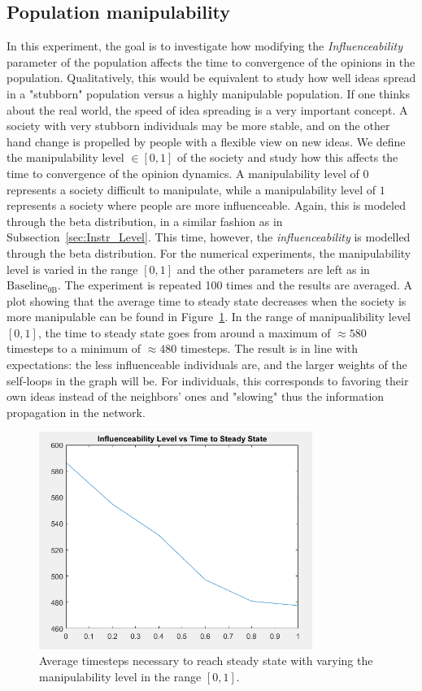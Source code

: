 \subsection{Population manipulability}
\label{sec:manipulability}
In this experiment, the goal is to investigate how modifying the \textit{Influenceability} parameter of the population affects the time to convergence of the opinions in the population. Qualitatively, this would be equivalent to study how well ideas spread in a "stubborn" population versus a highly manipulable population. If one thinks about the real world, the speed of idea spreading is a very important concept. A society with very stubborn individuals may be more stable, and on the other hand change is propelled by people with a flexible view on new ideas. 
We define the manipulability level $\in [0,1]$ of the society and study how this affects the time to convergence of the opinion dynamics. A manipulability level of $0$ represents a society difficult to manipulate, while a manipulability level of $1$ represents a society where people are more influenceable. Again, this is modeled through the beta distribution, in a similar fashion as in Subsection~\ref{sec:Instr_Level}. This time, however, the \textit{influenceability} is modelled through the beta distribution. For the numerical experiments, the manipulability level is varied in the range $[0,1]$ and the other parameters are left as in $\text{Baseline}_\text{0B}$. The experiment is repeated 100 times and the results are averaged. A plot showing that the average time to steady state decreases when the society is more manipulable can be found in Figure~\ref{pics:man_steadystate}. In the range of manipualibility level $[0,1]$, the time to steady state goes from around a maximum of $\approx 580$ timesteps to a minimum of $\approx 480$ timesteps. The result is in line with expectations: the less influenceable individuals are, and the larger weights of the self-loops in the graph will be. For individuals, this corresponds to favoring their own ideas instead of the neighbors' ones and "slowing" thus the information propagation in the network.
\begin{figure}[!t]
	\centering
	\includegraphics[width=3.5in]{Figures/Exp8_2.png}
	\caption{Average timesteps necessary to reach steady state with varying the manipulability level in the range $[0,1]$.}
\label{pics:man_steadystate}
\end{figure}


